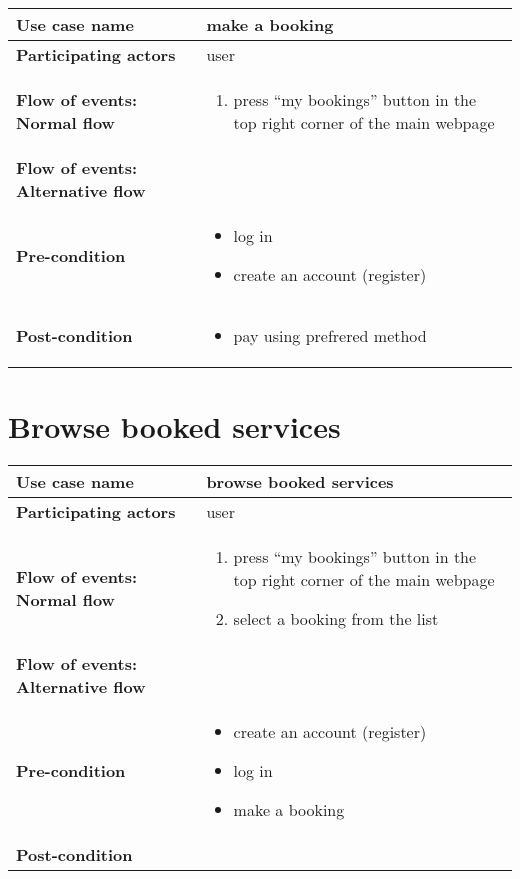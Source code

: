 \documentclass[a4paper, 13pt, draft]{report}
\begin{document}
\begin{center}
    \begin{tabular}{| >{\bf}l | p{5.55cm} |} 
	\hline
	Use case name & make a booking \\ 
	\hline
	Participating actors & user \\
	\hline
	Flow of events: Normal flow & 
	\begin{enumerate}		
	    \item press ``my bookings'' button in the top right corner of
		the main webpage
	\end{enumerate}	\\
	\hline
	Flow of events: Alternative flow & \notapplicable \\
	\hline
	Pre-condition & 
	\begin{itemize} 
	    \item log in
	    \item create an account (register)
	\end{itemize} \\
	\hline
	Post-condition & 
	\begin{itemize} 
	    \item pay using prefrered method
	\end{itemize} \\ 
	\hline
    \end{tabular}
\end{center}

\section*{Browse booked services}

\begin{center}
    \begin{tabular}{| >{\bf}l | p{5.55cm} |} 
	\hline
	Use case name & browse booked services \\ 
	\hline
	Participating actors & user \\
	\hline
	Flow of events: Normal flow & 
	\begin{enumerate}		
	    \item press ``my bookings'' button in the top right corner of the main webpage
	    \item select a booking from the list
	\end{enumerate}	\\
	\hline
	Flow of events: Alternative flow & \notapplicable \\
	\hline
	Pre-condition & 
	\begin{itemize} 
	    \item create an account (register)
	    \item log in
	    \item make a booking
	\end{itemize} \\
	\hline
	Post-condition & \notapplicable \\
	\hline
    \end{tabular}
\end{center}
\end{document}
